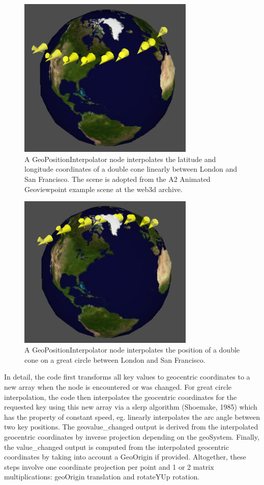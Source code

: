 \documentclass{acmsiggraph}                     %
\begin{document}
\begin{figure}[htbp] \centering \includegraphics[width=3.3in]{GeoPositionInterpolator1.png}
  \caption{A GeoPositionInterpolator node interpolates the latitude and longitude coordinates of a
  double cone linearly between London and San Francisco. The scene is adopted from the A2 Animated
Geoviewpoint example scene at the web3d archive.} \label{fig:GeoPositionInterpolator1.png}
\end{figure}

\begin{figure}[htbp] \centering \includegraphics[width=3.3in]{GeoPositionInterpolator2.png}
  \caption{A GeoPositionInterpolator node interpolates the position of a double cone on a great
  circle between London and San Francisco.} \label{fig:GeoPositionInterpolator2.png} \end{figure}

In detail, the code first transforms all key values to geocentric coordinates to a new array when
the node is encountered or was changed.  For great circle interpolation, the code then interpolates
the geocentric coordinates for the requested key using this new array via a slerp algorithm
(Shoemake, 1985) which has the property of constant speed, eg. linearly interpolates the arc angle
between two key positions. The geovalue\_changed output is derived from the interpolated geocentric
coordinates by inverse projection depending on the geoSystem. Finally, the  value\_changed output is
computed from the interpolated geocentric coordinates by taking into account a GeoOrigin if
provided. Altogether, these steps involve one coordinate projection per point and 1 or 2 matrix
multiplications: geoOrigin translation and rotateYUp rotation.
\end{document}
